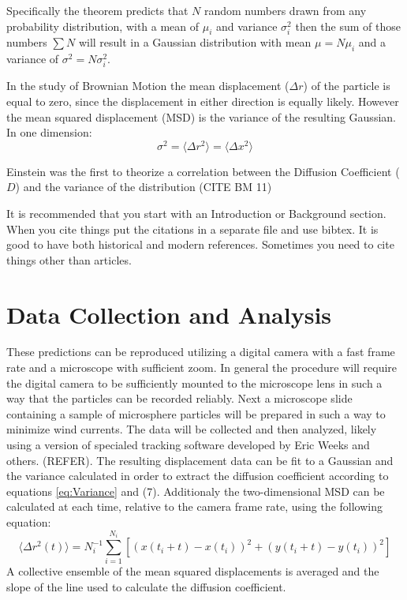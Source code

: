 \documentclass[aps,prb,twocolumn,groupedaddress,nofootinbib,floatfix]{revtex4}
\newcommand{\beq}{\begin{equation}}
\newcommand{\eeq}{\end{equation}}
\begin{document}
Specifically the theorem predicts that $N$ random numbers drawn from any probability distribution, with a mean of $\mu_i$ and variance $\sigma_{i}^2$ then the sum of those numbers $\sum N$ will result in a Gaussian distribution with mean $\mu = N\mu_i$ and a variance of $\sigma^2=N\sigma_{i}^2$. 

In the study of Brownian Motion the mean displacement ($\Delta{}r$) of the particle is equal to zero, since the displacement in either direction is equally likely. However the mean squared displacement (MSD) is the variance of the resulting Gaussian. In one dimension:
\beq
\sigma^2=\langle{}\Delta{}r^2\rangle{}=\langle{}\Delta{}x^2\rangle{}
\label{eq:Displacement}
\eeq


Einstein was the first to theorize a correlation between the Diffusion Coefficient ($D$) and the variance of the distribution (CITE BM 11)



It is recommended that you start with an Introduction or Background
section.  When you cite things \cite{Foner1} put the citations in a separate file and
use bibtex.   It is good to have both historical and modern references. \cite{Tickle,Basso}
Sometimes you need to cite things other than articles. \cite{UnitsTable}
%
\section*{Data Collection and Analysis}
These predictions can be reproduced utilizing a digital camera with a fast frame rate and a microscope with sufficient zoom. In general the procedure will require the digital camera to be sufficiently mounted to the microscope lens in such a way that the particles can be recorded reliably. Next a microscope slide containing a sample of microsphere particles will be prepared in such a way to minimize wind currents. The data will be collected and then analyzed, likely using a version of specialed tracking software developed by Eric Weeks and others. (REFER). The resulting displacement data can be fit to a Gaussian and the variance calculated in order to extract the diffusion coefficient according to equations \ref{eq:Variance} and (7). Additionaly the two-dimensional MSD can be calculated at each time, relative to the camera frame rate, using the following equation:
\beq
\langle\Delta{}r^{2}(t)\rangle{}=N_{i}^{-1}\sum_{i=1}^{N_i}\left[\left(x\left(t_{i}+t\right)-x\left(t_i\right)\right)^2+\left(y\left(t_{i}+t\right)-y\left(t_i\right)\right)^2\right]
\label{eq:two2dMSD}
\eeq
A collective ensemble of the mean squared displacements is averaged and the slope of the line used to calculate the diffusion coefficient.
\end{document}
